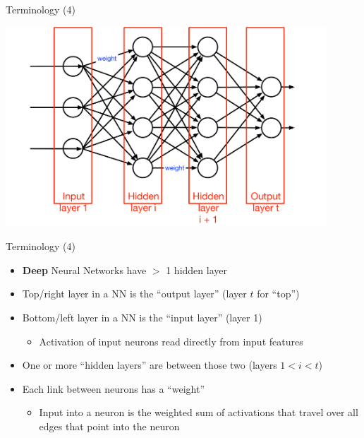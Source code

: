 \documentclass[aspectratio=169]{beamer}
\begin{document}
\begin{frame}{Terminology (4)}

\includegraphics[width=0.9\textwidth]{lectFF/nnTerms2.pdf}
\end{frame}
\begin{frame}{Terminology (4)}

\begin{itemize}
	\item \textbf{Deep} Neural Networks have $>$ 1 hidden layer
	\item Top/right layer in a NN is the ``output layer'' (layer $t$ for ``top'')
	\item Bottom/left layer in a NN is the ``input layer'' (layer 1)
	\begin{itemize}
                \item Activation of input neurons read directly from input features
	\end{itemize}	
	\item One or more ``hidden layers'' are between those two (layers $1 < i < t$)
	\item Each link between neurons has a ``weight''
	\begin{itemize}
                \item Input into a neuron is the weighted sum of activations that travel over all edges that
		point into the neuron
	\end{itemize}	
\end{itemize}
\end{frame}
\end{document}
